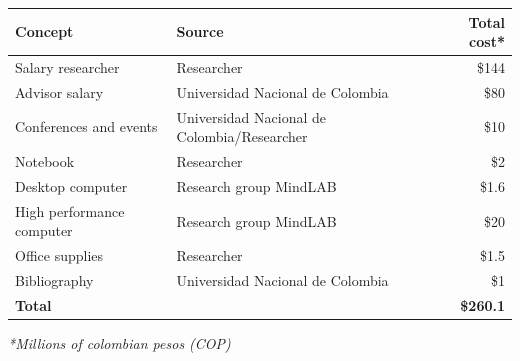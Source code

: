 \documentclass[letterpaper,12pt]{article}
\begin{document}
% 
 \begin{table}[!h]
 \centering
 \begin{tabular}{l l r}
 \hline
  \textbf{Concept} & \textbf{Source} & \textbf{Total cost}* \\
  \hline
  Salary researcher & Researcher & \$144 \\
  Advisor salary & Universidad Nacional de Colombia & \$80\\
  Conferences and events & Universidad Nacional de Colombia/Researcher & \$10 \\
  Notebook & Researcher & \$2\\
  Desktop computer & Research group MindLAB & \$1.6\\
  High performance computer & Research group MindLAB & \$20\\
  \hline
  Office supplies & Researcher & \$1.5\\
  Bibliography & Universidad Nacional de Colombia & \$1\\
  \hline
  \textbf{Total} & & \textbf{\$260.1}
 \end{tabular} 
 \end{table}
 \textit{*Millions of colombian pesos (COP)}
% 
% 
% 
% 
%  
%  
% 
% 
% 
% 
\end{document}
